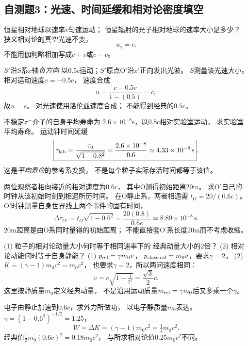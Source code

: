 \subsection{自测题3：光速、时间延缓和相对论密度填空}

\problemtext 恒星相对地球以速率$v$匀速运动；
恒星辐射的光子相对地球的速率大小是多少？
\workings
狭义相对论的真空光速不变，
\[
\boxed{u_\gamma=c}.
\]
\crosscheck 不能用伽利略相加写成$c+v$或$c-v$。

\problemtext $S'$沿$S$系$x$轴\emph{负方向}
以$0.5c$运动；$S'$原点O'沿$x'$正向发出光波。
$S$测量该光速大小。
\workings
相对运动速度$v=-0.5c$，
速度合成
\[
u=\frac{c-0.5c}{1-(0.5)}=c,
\]
故$\boxed{u=c}$。
\crosscheck 对光速使用洛伦兹速度合成；
不能得到经典的$0.5c$。

\problemtext 不稳定$\pi^+$介子的自身平均寿命为
$2.6\times10^{-8}$s，以$0.8c$相对实验室运动，
求实验室平均寿命。
\workings
运动钟时间延缓
\[
\boxed{\tau_{\rm lab}
=\frac{\tau_0}{\sqrt{1-0.8^2}}
=\frac{2.6\times10^{-8}}{0.6}
\simeq4.33\times10^{-8}\,\mathrm s}.
\]
\crosscheck 这是\emph{平均寿命}的参考系变换，
不是每个粒子实际存活时间都等于该值。

\problemtext 两位观察者相向接近的相对速度为$0.6c$，
其中O测得初始距离20m。
求O'自己的时钟从该初始时刻到相遇所历时间。
\workings
在O静止系，两者相遇需
$t_O=20/(0.6c)$。
O'时钟测量自身世界线上两个事件的固有时间，
\[
\boxed{\Delta\tau_{O'}=
t_O\sqrt{1-0.6^2}
=\frac{20(0.8)}{0.6c}
\simeq8.89\times10^{-8}\,\mathrm s}.
\]
\crosscheck 20m距离是由O系同时量得的初始距离；
不能直接套O'系长度20m而不考虑收缩。

\problemtext (1) 粒子的相对论动量大小何时等于相同速率下的
经典动量大小的2倍？
(2) 相对论动能何时等于自身静能？
\workings
(1) $p_{\rm rel}=\gamma m_0v$，
$p_{\rm classical}=m_0v$，要求$\gamma=2$。
(2) $K=(\gamma-1)m_0c^2=m_0c^2$，
也要求$\gamma=2$，所以两问速度相同：
\[
\boxed{v=c\sqrt{1-\tfrac1{2^2}}
=\frac{\sqrt3}{2}c}.
\]
\crosscheck 这里按静质量$m_0$定义经典动量，
不是沿用运动质量$m_{\rm rel}=\gamma m_0$后又多乘一个$\gamma$。

\problemtext 电子由静止加速到$0.6c$，求外力所做功，
以电子静质量$m_0$表达。
\workings
$\gamma=(1-0.6^2)^{-1/2}=1.25$，
\[
\boxed{W=\Delta K=(\gamma-1)m_0c^2
=\tfrac14m_0c^2}.
\]
\crosscheck 经典值$\tfrac12 m_0(0.6c)^2=0.18m_0c^2$，
与所求相对论值$0.25m_0c^2$不同。

